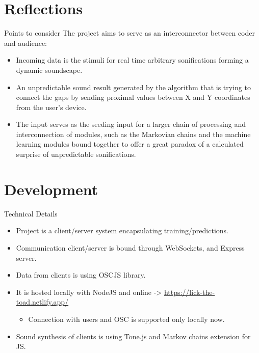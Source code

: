 \documentclass[t, 10pt, seahorse, bigger]{beamer}
\begin{document}
\section{Reflections}
\label{sec:orgf4a527d}
\begin{frame}[label={sec:org74df969}]{Points to consider}
The project aims to serve as an interconnector between coder and audience:
\begin{itemize}
\item Incoming data is the stimuli for real time arbitrary sonifications forming a dynamic soundscape.
\item An unpredictable sound result generated by the algorithm that is trying to connect the gaps by sending proximal values between X and Y coordinates from the user's device.
\item The input serves as the seeding input for a larger chain of processing and interconnection of modules, such as the Markovian chains and the machine learning modules bound together to offer a great paradox of a calculated surprise of unpredictable sonifications.
\end{itemize}
\end{frame}
\section{Development}
\label{sec:org4e18954}
\begin{frame}[label={sec:org0f4249d}]{Technical Details}
\begin{itemize}
\item Project is a client/server system encapsulating training/predictions.
\item Communication client/server is bound through WebSockets, and Express server.
\item Data from clients is using OSCJS library.
\item It is hosted locally with NodeJS and online -> \url{https://lick-the-toad.netlify.app/}
\begin{itemize}
\item Connection with users and OSC is supported only locally now.
\end{itemize}
\item Sound synthesis of clients is using Tone.js and Markov chains extension for JS.
\end{itemize}
\end{frame}
\end{document}
